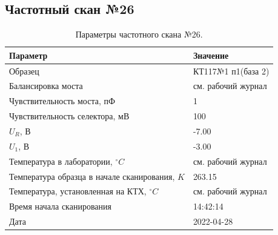 \subsection{Частотный скан №26}
\begin{table}[!ht]
    \centering
    \caption{Параметры частотного скана №26.}
    \begin{tabular}{|l|l|}
        \hline
        Параметр                                       & Значение                  \\ \hline
        Образец                                        & КТ117№1 п1(база 2)        \\ \hline
        Балансировка моста                             & см. рабочий журнал        \\ \hline
        Чувствительность моста, пФ                     & 1                         \\ \hline
        Чувствительность селектора, мВ                 & 100                       \\ \hline
        $U_R$, В                                       & -7.00                     \\ \hline
        $U_1$, В                                       & -3.00                     \\ \hline
        Температура в лаборатории, $^\circ C$          & см. рабочий журнал        \\ \hline
        Температура образца в начале сканирования, $K$ & 263.15                    \\ \hline
        Температура, установленная на КТХ, $^\circ C$  & см. рабочий журнал        \\ \hline
        Время начала сканирования                      & 14:42:14                  \\ \hline
        Дата                                           & 2022-04-28                \\ \hline
    \end{tabular}
    \label{table:frequency_scan_26}
\end{table}

